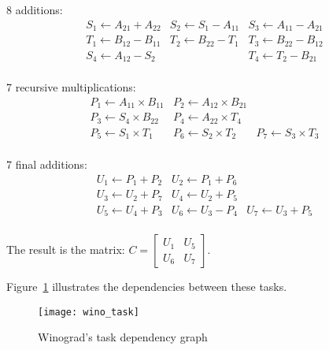 \documentclass{article}
\begin{document}
\begin{inparaenum}[$\bullet$\xspace]
\item 8 additions:
$$\begin{array}{lll}
  S_1  \leftarrow A_{21} + A_{22}	& S_2  \leftarrow S_1 - A_{11}
  & S_3  \leftarrow A_{11} - A_{21} \\
T_1 \leftarrow B_{12} - B_{11} & T_2 \leftarrow B_{22} - T_1 & T_3 \leftarrow B_{22} - B_{12} \\
  S_4  \leftarrow A_{12} - S_2		&				& T_4 \leftarrow T_2 - B_{21}	 \\
\end{array}$$
\item 7 recursive multiplications:
$$\begin{array}{lll}
  P_1  \leftarrow A_{11} \times B_{11}  &  P_2  \leftarrow A_{12}
  \times B_{21}  \\
P_3  \leftarrow S_4 \times B_{22}     &P_4  \leftarrow A_{22} \times
T_4	\\
P_5 \leftarrow S_1 \times T_1 & P_6\leftarrow S_2 \times T_2 & P_7 \leftarrow S_3 \times T_3 \\
 \end{array}$$\item 7 final additions:
$$\begin{array}{lll}
  U_1  \leftarrow P_1 + P_2 & U_2  \leftarrow P_1 + P_6 \\
U_3  \leftarrow U_2 + P_7 &U_4  \leftarrow U_2 + P_5\\
U_5 \leftarrow U_4 + P_3 & U_6 \leftarrow U_3 - P_4& U_7 \leftarrow U_3 + P_5  \\
\end{array}$$
\item The result is the matrix:
{ $ C = \left[ \begin{array}{ll} U_1 & U_5 \\ U_6 & U_7 \end{array} \right]$}.
\end{inparaenum}

Figure~\ref{fig:winotask} illustrates the dependencies between these tasks.
\begin{figure}[htb]
\begin{center}
\texttt{[image: wino\_task]}
\caption{Winograd's task dependency graph}
\label{fig:winotask}
\end{center}
\end{figure}
\end{document}
